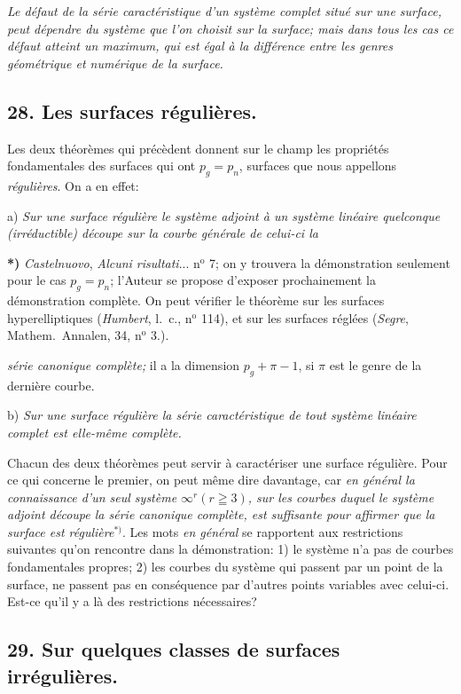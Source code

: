 \documentclass{article}
\begin{document}
\emph{Le défaut de la série caractéristique d'un système complet situé sur une surface, peut dépendre du système que l'on choisit sur la surface; mais dans tous les cas ce défaut atteint un maximum, qui est égal à la différence entre les genres géométrique et numérique de la surface.}

\subsection*{28. Les surfaces régulières.}

Les deux théorèmes qui précèdent donnent sur le champ les propriétés fondamentales des surfaces qui ont $p_{g} = p_{n}$, surfaces que nous appellons \emph{régulières}. On a en effet:

a) \emph{Sur une surface régulière le système adjoint à un système linéaire quelconque (irréductible) découpe sur la courbe générale de celui-ci la}

\textbf{*)} \emph{Castelnuovo}, \emph{Alcuni risultati}... n${}^{\text{o}}$ 7; on y trouvera la démonstration seulement pour le cas $p_{g} = p_{n}$; l'Auteur se propose d'exposer prochainement la démonstration complète. On peut vérifier le théorème sur les surfaces hyperelliptiques (\emph{Humbert}, l.\ c., n${}^{\text{o}}$ 114), et sur les surfaces réglées (\emph{Segre}, Mathem.\ Annalen, 34, n${}^{\text{o}}$ 3.).

\emph{série canonique complète;} il a la dimension $p_{g} + \pi - 1$, si $\pi$ est le genre de la dernière courbe.

b) \emph{Sur une surface régulière la série caractéristique de tout système linéaire complet est elle-même complète.}

Chacun des deux théorèmes peut servir à caractériser une surface régulière. Pour ce qui concerne le premier, on peut même dire davantage, car \emph{en général la connaissance d'un seul système $\infty^{r} (r \geqq 3)$, sur les courbes duquel le système adjoint découpe la série canonique complète, est suffisante pour affirmer que la surface est régulière}${}^{*)}$. Les mots \emph{en général} se rapportent aux restrictions suivantes qu'on rencontre dans la démonstration: 1) le système n'a pas de courbes fondamentales propres; 2) les courbes du système qui passent par un point de la surface, ne passent pas en conséquence par d'autres points variables avec celui-ci. Est-ce qu'il y a là des restrictions nécessaires?

\subsection*{29. Sur quelques classes de surfaces irrégulières.}
\end{document}
